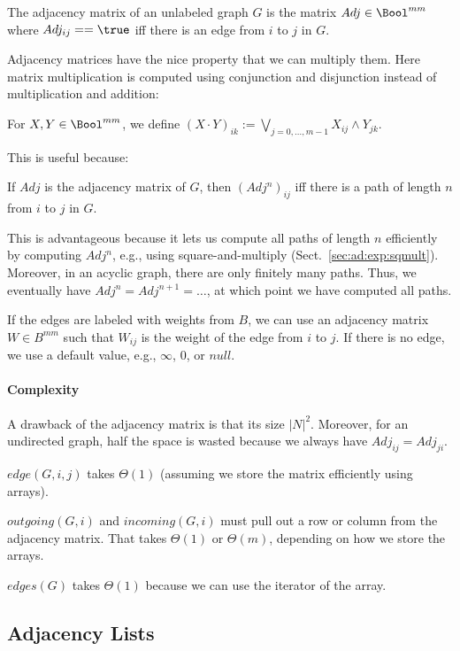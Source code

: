 \begin{definition}
The adjacency matrix of an unlabeled graph $G$ is the matrix $Adj\in \Bool^{mm}$ where $Adj_{ij}==\true$ iff there is an edge from $i$ to $j$ in $G$.
\end{definition}

Adjacency matrices have the nice property that we can multiply them.
Here matrix multiplication is computed using conjunction and disjunction instead of multiplication and addition:
\begin{definition}
For $X,Y\in \Bool^{mm}$, we define $(X\cdot Y)_{ik}:= \bigvee_{j=0,\ldots,m-1}X_{ij}\wedge Y_{jk}$.
\end{definition}
This is useful because:
\begin{theorem}
If $Adj$ is the adjacency matrix of $G$, then $(Adj^n)_{ij}$ iff there is a path of length $n$ from $i$ to $j$ in $G$.
\end{theorem}

This is advantageous because it lets us compute all paths of length $n$ efficiently by computing $Adj^n$, e.g., using square-and-multiply (Sect.~\ref{sec:ad:exp:sqmult}).
Moreover, in an acyclic graph, there are only finitely many paths.
Thus, we eventually have $Adj^n=Adj^{n+1}=\ldots$, at which point we have computed all paths.

If the edges are labeled with weights from $B$, we can use an adjacency matrix $W\in B^{mm}$ such that $W_{ij}$ is the weight of the edge from $i$ to $j$.
If there is no edge, we use a default value, e.g., $\infty$, $0$, or $null$.

\paragraph{Complexity}
A drawback of the adjacency matrix is that its size $|N|^2$.
Moreover, for an undirected graph, half the space is wasted because we always have $Adj_{ij}=Adj_{ji}$.

$edge(G,i,j)$ takes $\Theta(1)$ (assuming we store the matrix efficiently using arrays).

$outgoing(G,i)$ and $incoming(G,i)$ must pull out a row or column from the adjacency matrix.
That takes $\Theta(1)$ or $\Theta(m)$, depending on how we store the arrays.

$edges(G)$ takes $\Theta(1)$ because we can use the iterator of the array.

\subsection{Adjacency Lists}


